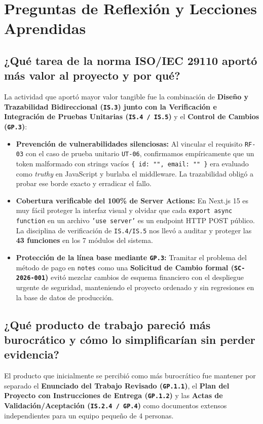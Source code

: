 \documentclass[11pt,a4paper]{article}
\begin{document}
\section{Preguntas de Reflexión y Lecciones Aprendidas}

\subsection{¿Qué tarea de la norma ISO/IEC 29110 aportó más valor al proyecto y por qué?}
La actividad que aportó mayor valor tangible fue la combinación de \textbf{Diseño y Trazabilidad Bidireccional (\texttt{IS.3}) junto con la Verificación e Integración de Pruebas Unitarias (\texttt{IS.4 / IS.5})} y el \textbf{Control de Cambios (\texttt{GP.3})}:
\begin{itemize}[noitemsep]
  \item \textbf{Prevención de vulnerabilidades silenciosas:} Al vincular el requisito \texttt{RF-03} con el caso de prueba unitario \texttt{UT-06}, confirmamos empíricamente que un token malformado con strings vacíos \texttt{\{ id: "", email: "" \}} era evaluado como \textit{truthy} en JavaScript y burlaba el middleware. La trazabilidad obligó a probar ese borde exacto y erradicar el fallo.
  \item \textbf{Cobertura verificable del 100\% de Server Actions:} En Next.js 15 es muy fácil proteger la interfaz visual y olvidar que cada \texttt{export async function} en un archivo \texttt{'use server'} es un endpoint HTTP POST público. La disciplina de verificación de \texttt{IS.4/IS.5} nos llevó a auditar y proteger las \textbf{43 funciones} en los 7 módulos del sistema.
  \item \textbf{Protección de la línea base mediante \texttt{GP.3}:} Tramitar el problema del método de pago en \texttt{notes} como una \textbf{Solicitud de Cambio formal (\texttt{SC-2026-001})} evitó mezclar cambios de esquema financiero con el despliegue urgente de seguridad, manteniendo el proyecto ordenado y sin regresiones en la base de datos de producción.
\end{itemize}

\subsection{¿Qué producto de trabajo pareció más burocrático y cómo lo simplificarían sin perder evidencia?}
El producto que inicialmente se percibió como más burocrático fue mantener por separado el \textbf{Enunciado del Trabajo Revisado (\texttt{GP.1.1})}, el \textbf{Plan del Proyecto con Instrucciones de Entrega (\texttt{GP.1.2})} y las \textbf{Actas de Validación/Aceptación (\texttt{IS.2.4 / GP.4})} como documentos extensos independientes para un equipo pequeño de 4 personas.
\end{document}
